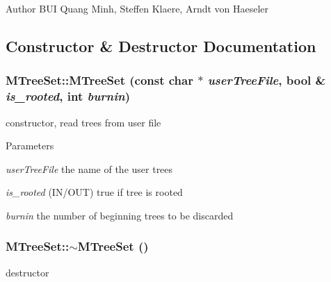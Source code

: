 \begin{DoxyAuthor}{Author}
BUI Quang Minh, Steffen Klaere, Arndt von Haeseler 
\end{DoxyAuthor}


\subsection{Constructor \& Destructor Documentation}
\hypertarget{classMTreeSet_a88d94d529da4f81c2fe4537baa794333}{
\subsubsection[{MTreeSet}]{\setlength{\rightskip}{0pt plus 5cm}MTreeSet::MTreeSet (const char $\ast$ {\em userTreeFile}, \/  bool \& {\em is\_\-rooted}, \/  int {\em burnin})}}
\label{classMTreeSet_a88d94d529da4f81c2fe4537baa794333}
constructor, read trees from user file 
\begin{DoxyParams}{Parameters}
\item[{\em userTreeFile}]the name of the user trees \item[{\em is\_\-rooted}](IN/OUT) true if tree is rooted \item[{\em burnin}]the number of beginning trees to be discarded \end{DoxyParams}
\hypertarget{classMTreeSet_a27a34c268f7cdd554271771363d4d104}{
\subsubsection[{$\sim$MTreeSet}]{\setlength{\rightskip}{0pt plus 5cm}MTreeSet::$\sim$MTreeSet ()}}
\label{classMTreeSet_a27a34c268f7cdd554271771363d4d104}
destructor 

